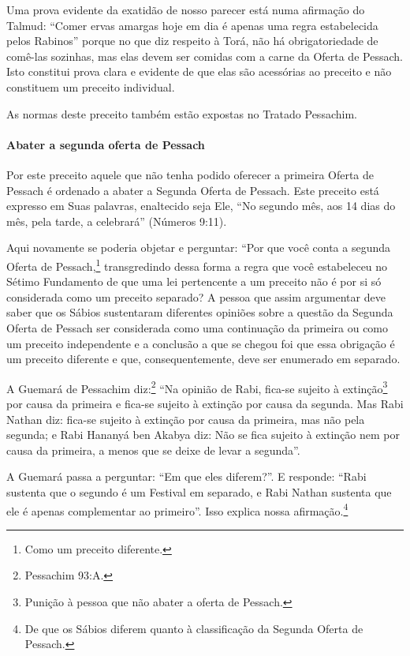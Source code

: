 Uma prova evidente da exatidão de nosso parecer está numa afirmação do
Talmud: ``Comer ervas amargas hoje em dia é apenas uma regra
estabelecida pelos Rabinos'' porque no que diz respeito à Torá, não há
obrigatoriedade de comê-las sozinhas, mas elas devem ser comidas com a
carne da Oferta de Pessach. Isto constitui prova clara e evidente de
que elas são acessórias ao preceito e não constituem um preceito
individual.

As normas deste preceito também estão expostas no Tratado Pessachim.

\paragraph{Abater a segunda oferta de Pessach}

Por este preceito aquele que não tenha podido oferecer a primeira Oferta
de Pessach é ordenado a abater a Segunda Oferta de Pessach. Este
preceito está expresso em Suas palavras, enaltecido seja Ele, ``No
segundo mês, aos 14 dias do mês, pela tarde, a celebrará'' (Números
9:11).

Aqui novamente se poderia objetar e perguntar: ``Por que você conta a segunda Oferta de Pessach,\footnote{Como um preceito diferente.} transgredindo dessa forma a regra que você estabeleceu no Sétimo Fundamento de que uma lei pertencente a um
preceito não é por si só considerada como um preceito separado? A pessoa que
assim argumentar deve saber que os Sábios sustentaram diferentes
opiniões sobre a questão da Segunda Oferta de Pessach ser considerada
como uma continuação da primeira ou como um preceito independente e a
conclusão a que se chegou foi que essa obrigação é um preceito
diferente e que, consequentemente, deve ser enumerado em separado.

A Guemará de Pessachim diz:\footnote{Pessachim 93:A.} ``Na opinião de Rabi,
fica-se sujeito à extinção\footnote{Punição à pessoa que não abater a oferta de Pessach.} por causa da primeira e fica-se sujeito
à extinção por causa da segunda. Mas Rabi Nathan diz: fica-se sujeito à
extinção por causa da primeira,
mas não pela segunda; e Rabi Hananyá ben Akabya diz: Não se fica sujeito
à extinção nem por causa da primeira, a menos que se deixe de levar a
segunda''.

A Guemará passa a perguntar: ``Em que eles diferem?''. E responde:
``Rabi sustenta que o segundo é um Festival em separado, e Rabi Nathan
sustenta que ele é apenas complementar ao primeiro''. Isso explica nossa
afirmação.\footnote{De que os Sábios diferem quanto à classificação da Segunda Oferta de
  Pessach.}

